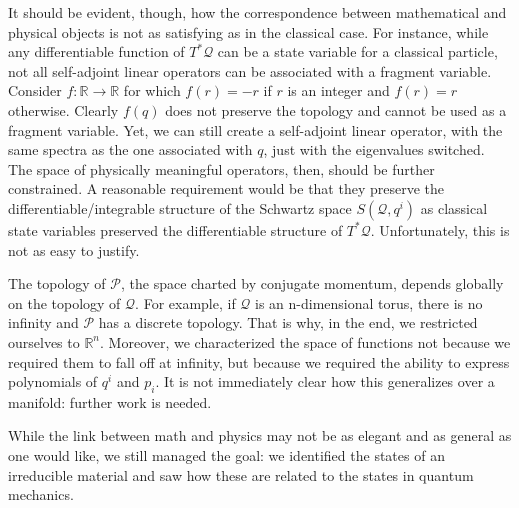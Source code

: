 \documentclass[smallextended]{svjour3}
\numberwithin{equation}{section}
\begin{document}
It should be evident, though, how the correspondence between mathematical and physical objects is not as satisfying as in the classical case. For instance, while any differentiable function of $T^*\mathcal{Q}$ can be a state variable for a classical particle, not all self-adjoint linear operators can be associated with a fragment variable. Consider $f: \mathbb{R} \rightarrow \mathbb{R}$ for which $f(r) = -r$ if $r$ is an integer and $f(r) = r$ otherwise. Clearly $f(q)$ does not preserve the topology and cannot be used as a fragment variable. Yet, we can still create a self-adjoint linear operator, with the same spectra as the one associated with $q$, just with the eigenvalues switched. The space of physically meaningful operators, then, should be further constrained. A reasonable requirement would be that they preserve the differentiable/integrable structure of the Schwartz space $S(\mathcal{Q}, q^i)$ as classical state variables preserved the differentiable structure of $T^*\mathcal{Q}$. Unfortunately, this is not as easy to justify.

The topology of $\mathcal{P}$, the space charted by conjugate momentum, depends globally on the topology of $\mathcal{Q}$. For example, if $\mathcal{Q}$ is an n-dimensional torus, there is no infinity and $\mathcal{P}$ has a discrete topology. That is why, in the end, we restricted ourselves to $\mathbb{R}^n$. Moreover, we characterized the space of functions not because we required them to fall off at infinity, but because we required the ability to express polynomials of $q^i$ and $p_i$. It is not immediately clear how this generalizes over a manifold: further work is needed.

While the link between math and physics may not be as elegant and as general as one would like, we still managed the goal: we identified the states of an irreducible material and saw how these are related to the states in quantum mechanics.


\end{document}
